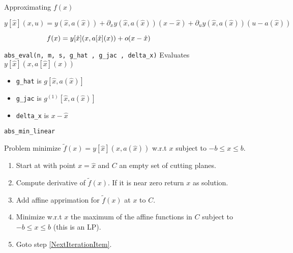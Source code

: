 \documentclass{beamer}
\begin{document}
\begin{frame}{Approximating $f(x)$}

\[
y[ \hat{x} ]( x , u )
=
y ( \hat{x}, a( \hat{x} ) )
	+ \partial_x y ( \hat{x}, a( \hat{x} ) ) ( x - \hat{x} )
	+ \partial_u y ( \hat{x}, a( \hat{x} ) ) ( u - a( \hat{x} ) )
\]
\pause


\[
f(x) = y[ \hat{x} ] ( x , a[ \hat{x} ] (x) ) + o ( x - \hat{x} )
\phantom{\rule{1.3in}{1pt}}
\]

\begin{block}{ \texttt{abs\_eval(n, m, s, g\_hat , g\_jac , delta\_x)} }
Evaluates $y[ \hat{x} ] ( x , a[ \hat{x} ] (x) )$
\end{block}
\pause

\begin{itemize}

\item
\texttt{g\_hat} is $g[ \hat{x} , a( \hat{x} ) ]$
\pause

\item
\texttt{g\_jac} is $g^{(1)} [ \hat{x} , a( \hat{x} ) ]$
\pause

\item
\texttt{delta\_x} is $x - \hat{x}$

\end{itemize}


\end{frame}

\begin{frame}{ \texttt{abs\_min\_linear} }

\begin{block}{Problem}
minimize $\tilde{f} ( x ) = y[ \hat{x} ] ( x , a( \hat{x} ) )$ w.r.t
$x$ subject to $-b \leq x \leq b$.
\end{block}
\pause

\begin{enumerate}

\item
Start at with point  $x = \hat{x}$ and $C$ an empty set of
cutting planes.
\pause

\item
\label{NextIterationItem}
Compute derivative of $\tilde{f} ( x )$.
If it is near zero return $x$ as solution.
\pause

\item
Add affine apprimation for $\tilde{f} ( x )$ at $x$ to $C$.
\pause


\item
Minimize w.r.t $x$ the maximum of the affine functions in $C$
subject to $-b \leq x \leq b$ (this is an LP).
\pause


\item
Goto step \ref{NextIterationItem}.

\end{enumerate}


\end{frame}
\end{document}
